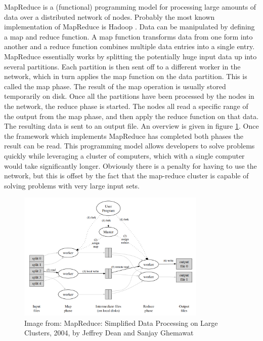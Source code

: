 MapReduce is a (functional) programming model for processing large amounts of
data over a distributed network of nodes. Probably the most known implementation
of MapReduce is Hadoop \cite{Hadoop}. Data can be manipulated by defining a map
and reduce function. A map function transforms data from one form into another
and a reduce function combines multiple data entries into a single entry.
MapReduce essentially works by splitting the potentially huge input data up into
several partitions. Each partition is then sent off to a different worker in the
network, which in turn applies the map function on the data partition. This is
called the map phase. The result of the map operation is usually stored
temporarily on disk. Once all the partitions have been processed by the nodes in
the network, the reduce phase is started. The nodes all read a specific range of
the output from the map phase, and then apply the reduce function on that data.
The resulting data is sent to an output file. An overview is given in figure
\ref{fig:mapreduce}. Once the framework which implements MapReduce has completed
both phases the result can be read. This programming model allows developers to
solve problems quickly while leveraging a cluster of computers, which with a
single computer would take significantly longer. Obviously there is a penalty
for having to use the network, but this is offset by the fact that the
map-reduce cluster is capable of solving problems with very large input sets.

\begin{figure}[htb]
\includegraphics[width=340px]{mapreduce.png}
\caption{Image from: MapReduce: Simplified Data Processing on Large Clusters, 2004, by Jeffrey Dean and Sanjay Ghemawat}
\label{fig:mapreduce}
\end{figure}
